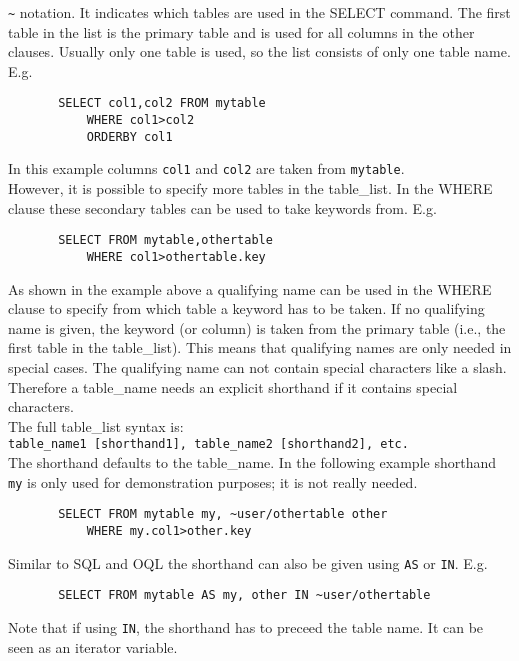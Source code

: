 \begin{description}
       \verb+~+ notation.
       It indicates which tables are used in
       the SELECT command. The first table in the list is the primary
       table and is used for all columns in the other clauses.
       Usually only one table is used, so the list consists of only one
       table name. E.g.
       \begin{verbatim}
       SELECT col1,col2 FROM mytable
           WHERE col1>col2
           ORDERBY col1
       \end{verbatim}
       In this example columns \texttt{col1} and \texttt{col2}
       are taken from \texttt{mytable}.
       \\However, it is possible to specify more tables in the table\_list.
       In the WHERE clause these secondary tables can be used to take
       keywords from. E.g.
       \begin{verbatim}
       SELECT FROM mytable,othertable
           WHERE col1>othertable.key
       \end{verbatim}
       As shown in the example above a qualifying name
       can be used in the WHERE
       clause to specify from which table a keyword has to be taken.
       If no qualifying name is given, the keyword (or column) is taken
       from the primary table (i.e., the first table in the table\_list).
       This means that qualifying names are only needed in special cases.
       The qualifying name can not contain special characters like a slash.
       Therefore a table\_name needs an explicit shorthand if it contains
       special characters.
       \\The full table\_list syntax is:
       \\
       \texttt{table\_name1 [shorthand1], table\_name2 [shorthand2], etc.}
       \\The shorthand defaults to the table\_name.
       In the following example shorthand \texttt{my} is only used
       for demonstration purposes; it is not really needed.
       \begin{verbatim}
       SELECT FROM mytable my, ~user/othertable other
           WHERE my.col1>other.key
       \end{verbatim}
       Similar to SQL and OQL the shorthand can also be given using
       \texttt{AS} or \texttt{IN}. E.g.
       \begin{verbatim}
       SELECT FROM mytable AS my, other IN ~user/othertable
       \end{verbatim}
       Note that if using \texttt{IN}, the shorthand has to preceed
       the table name. It can be seen as an iterator variable.


\end{description}

